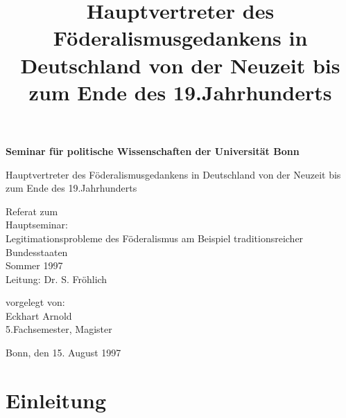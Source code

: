 \documentclass[a4paper,12pt]{article}
\begin{document}


\begin{titlepage}

\title{Hauptvertreter des Föderalismusgedankens in
Deutschland von der Neuzeit bis zum Ende des
19.Jahrhunderts}

\setlength{\parindent}{0em}

\begin{center}{\large {\bf Seminar für politische Wissenschaften der
Universität Bonn}}\end{center}

\setlength{\parskip}{2cm}

\begin{center}{\Large Hauptvertreter des Föderalismusgedankens in
Deutschland von der Neuzeit bis zum Ende des
19.Jahrhunderts}\end{center}

\setlength{\parskip}{3cm}

Referat zum\\Hauptseminar:\\Legitimationsprobleme des Föderalismus
am Beispiel traditionsreicher Bundesstaaten\\Sommer
1997\\[0.5cm]Leitung: Dr. S. Fröhlich

\setlength{\parskip}{1cm}

vorgelegt von:\\[0.5cm]Eckhart Arnold\\5.Fachsemester, Magister

\setlength{\parskip}{1cm}

Bonn, den 15. August 1997

\end{titlepage}

 \tableofcontents

\newpage

 \setcounter{page}{1}

\section{Einleitung}
\end{document}
